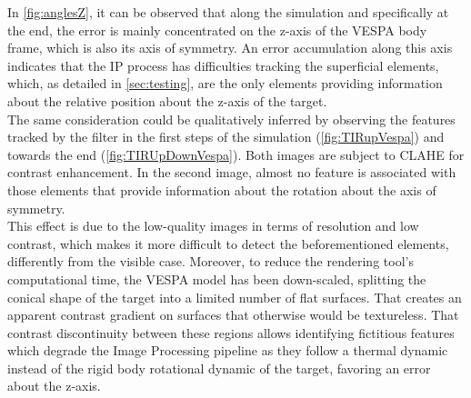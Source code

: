 In \cref{fig:anglesZ}, it can be observed that along the simulation and specifically at the end, the error is mainly concentrated on the z-axis of the VESPA body frame, which is also its axis of symmetry. An error accumulation along this axis indicates that the IP process has difficulties tracking the superficial elements, which, as detailed in \cref{sec:testing}, are the only elements providing information about the relative position about the z-axis of the target. \\
The same consideration could be qualitatively inferred by observing the features tracked by the filter in the first steps of the simulation (\cref{fig:TIRupVespa}) and towards the end (\cref{fig:TIRUpDownVespa}). Both images are subject to CLAHE for contrast enhancement. In the second image, almost no feature is associated with those elements that provide information about the rotation about the axis of symmetry. \\
This effect is due to the low-quality images in terms of resolution and low contrast, which makes it more difficult to detect the beforementioned elements, differently from the visible case. Moreover, to reduce the rendering tool's computational time, the VESPA model has been down-scaled, splitting the conical shape of the target into a limited number of flat surfaces. That creates an apparent contrast gradient on surfaces that otherwise would be textureless. That contrast discontinuity between these regions allows identifying fictitious features which degrade the Image Processing pipeline as they follow a thermal dynamic instead of the rigid body rotational dynamic of the target, favoring an error about the z-axis.\\

